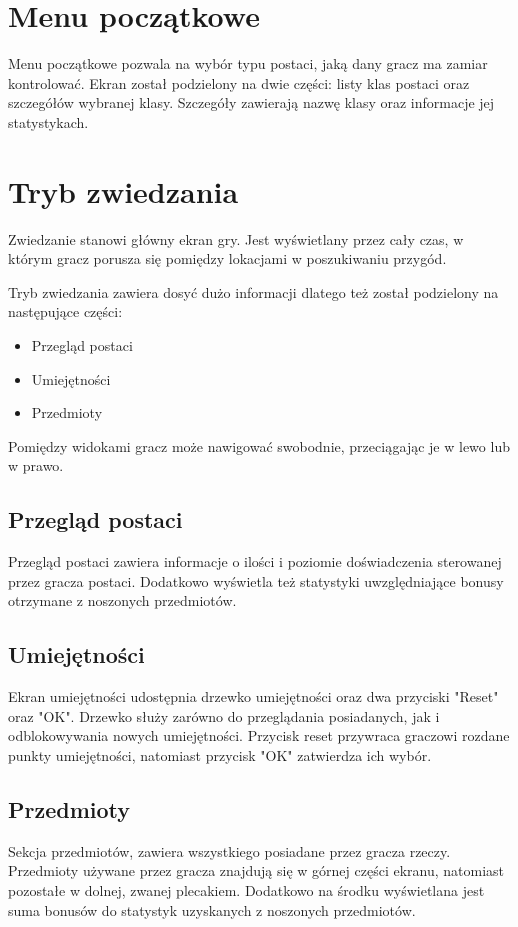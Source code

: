 \documentclass	{xmgr}
\begin{document}
\section{Menu początkowe}
Menu początkowe pozwala na wybór typu postaci, jaką dany gracz ma zamiar kontrolować. Ekran został podzielony na dwie części: listy klas postaci oraz szczegółów wybranej klasy. Szczegóły zawierają nazwę klasy oraz informacje jej statystykach.
\section{Tryb zwiedzania}
Zwiedzanie stanowi główny ekran gry. Jest wyświetlany przez cały czas, w którym gracz porusza się pomiędzy lokacjami w poszukiwaniu przygód. 

Tryb zwiedzania zawiera dosyć dużo informacji dlatego też został podzielony na następujące części: 
\begin{itemize}
	\item Przegląd postaci
	\item Umiejętności
	\item Przedmioty
\end{itemize}
Pomiędzy widokami gracz może nawigować swobodnie, przeciągając je w lewo lub w prawo.
\subsection*{Przegląd postaci}
Przegląd postaci zawiera informacje o ilości i poziomie doświadczenia sterowanej przez gracza postaci. Dodatkowo wyświetla też statystyki uwzględniające bonusy otrzymane z noszonych przedmiotów.
\subsection*{Umiejętności}
Ekran umiejętności udostępnia drzewko umiejętności oraz dwa przyciski "Reset" oraz "OK". Drzewko służy zarówno do przeglądania posiadanych, jak i odblokowywania nowych umiejętności. Przycisk reset przywraca graczowi rozdane punkty umiejętności, natomiast przycisk "OK" zatwierdza ich wybór.
\subsection*{Przedmioty}
Sekcja przedmiotów, zawiera wszystkiego posiadane przez gracza rzeczy. Przedmioty używane przez gracza znajdują się w górnej części ekranu, natomiast pozostałe w dolnej, zwanej plecakiem. Dodatkowo na środku wyświetlana jest suma bonusów do statystyk uzyskanych z noszonych przedmiotów.
\end{document}
